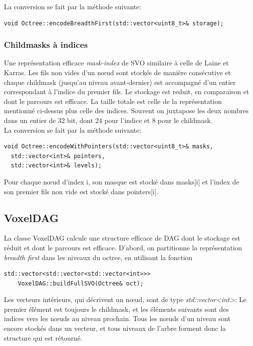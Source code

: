 \documentclass[a4paper]{article}
\begin{document}
La conversion se fait par la méthode suivante:
\begin{lstlisting}
void Octree::encodeBreadthFirst(std::vector<uint8_t>& storage);
\end{lstlisting}


\subsubsection{Childmasks à indices} %

Une représentation efficace \textit{mask-index} de SVO similaire à celle de Laine et Karras. Les fils non vides d'un nœud sont stockés de manière consécutive et chaque childmask (jusqu'au niveau avant-dernier) est accompagné d'un entier correspondant à l'indice du premier fils. Le stockage est reduit, en comparaison et dont le parcours est efficace. La taille totale est celle de la représentation mentionné ci-dessus plus celle des indices. Souvent on juxtapose les deux nombres dans un entier de 32 bit, dont 24 pour l'indice et 8 pour le childmask. \\

La conversion se fait par la méthode suivante:
\begin{lstlisting}
void Octree::encodeWithPointers(std::vector<uint8_t>& masks, 
  std::vector<int>& pointers, 
  std::vector<int>& levels);
\end{lstlisting}

Pour chaque nœud d'index i, son masque est stocké dans masks[i] et l’index de son premier fils non vide est stocké dans pointers[i].



\subsection{VoxelDAG} %
La classe VoxelDAG calcule une structure efficace de DAG dont le stockage est réduit et dont le parcours est efficace. D'abord, on partitionne la représentation \textit{breadth first} dans les niveaux du octree, en utilisant la fonction
\begin{lstlisting}
std::vector<std::vector<std::vector<int>>> 
    VoxelDAG::buildFullSVO(Octree& oct);
\end{lstlisting}

Les vecteurs intérieurs, qui décrivent un nœud, sont de type \textit{std::vector<int>}: Le premier élément est toujours le childmask, et les éléments suivants sont des indices vers les nœuds au niveau prochain. Tous les nœuds d'un niveau sont encore stockés dans un vecteur, et tous niveaux de l'arbre forment donc la structure qui est rétourné. \\
\end{document}
